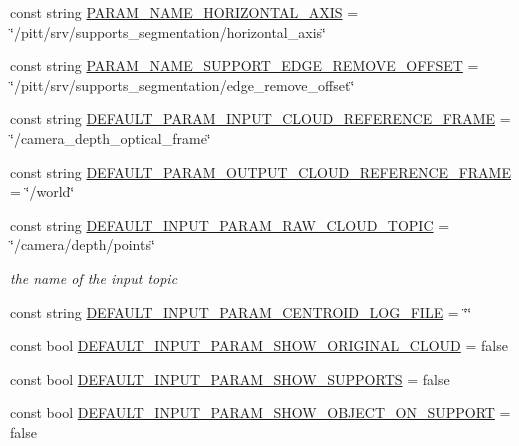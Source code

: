 \begin{DoxyCompactItemize}
\item 
const string \hyperlink{namespacesrvm_a2957bf6ee16944664364c470f1beb958}{P\-A\-R\-A\-M\-\_\-\-N\-A\-M\-E\-\_\-\-H\-O\-R\-I\-Z\-O\-N\-T\-A\-L\-\_\-\-A\-X\-I\-S} = \char`\"{}/pitt/srv/supports\-\_\-segmentation/horizontal\-\_\-axis\char`\"{}
\item 
const string \hyperlink{namespacesrvm_a07211b3f36f93931af6e67097b75f145}{P\-A\-R\-A\-M\-\_\-\-N\-A\-M\-E\-\_\-\-S\-U\-P\-P\-O\-R\-T\-\_\-\-E\-D\-G\-E\-\_\-\-R\-E\-M\-O\-V\-E\-\_\-\-O\-F\-F\-S\-E\-T} = \char`\"{}/pitt/srv/supports\-\_\-segmentation/edge\-\_\-remove\-\_\-offset\char`\"{}
\item 
const string \hyperlink{namespacesrvm_a2c4c31d893bfef55ede38ab56f4e7658}{D\-E\-F\-A\-U\-L\-T\-\_\-\-P\-A\-R\-A\-M\-\_\-\-I\-N\-P\-U\-T\-\_\-\-C\-L\-O\-U\-D\-\_\-\-R\-E\-F\-E\-R\-E\-N\-C\-E\-\_\-\-F\-R\-A\-M\-E} = \char`\"{}/camera\-\_\-depth\-\_\-optical\-\_\-frame\char`\"{}
\item 
const string \hyperlink{namespacesrvm_a228565e6d2ec6f457f78c4412d6c7daa}{D\-E\-F\-A\-U\-L\-T\-\_\-\-P\-A\-R\-A\-M\-\_\-\-O\-U\-T\-P\-U\-T\-\_\-\-C\-L\-O\-U\-D\-\_\-\-R\-E\-F\-E\-R\-E\-N\-C\-E\-\_\-\-F\-R\-A\-M\-E} = \char`\"{}/world\char`\"{}
\item 
const string \hyperlink{namespacesrvm_afb9bab9dced618a8992cf505cf484b1c}{D\-E\-F\-A\-U\-L\-T\-\_\-\-I\-N\-P\-U\-T\-\_\-\-P\-A\-R\-A\-M\-\_\-\-R\-A\-W\-\_\-\-C\-L\-O\-U\-D\-\_\-\-T\-O\-P\-I\-C} = \char`\"{}/camera/depth/points\char`\"{}
\begin{DoxyCompactList}\small\item\em the name of the input topic \end{DoxyCompactList}\item 
const string \hyperlink{namespacesrvm_a92921b8b79655fa69a697a54dca42056}{D\-E\-F\-A\-U\-L\-T\-\_\-\-I\-N\-P\-U\-T\-\_\-\-P\-A\-R\-A\-M\-\_\-\-C\-E\-N\-T\-R\-O\-I\-D\-\_\-\-L\-O\-G\-\_\-\-F\-I\-L\-E} = \char`\"{}\char`\"{}
\item 
const bool \hyperlink{namespacesrvm_ac54afc31491c977345ef1a1fbb563be3}{D\-E\-F\-A\-U\-L\-T\-\_\-\-I\-N\-P\-U\-T\-\_\-\-P\-A\-R\-A\-M\-\_\-\-S\-H\-O\-W\-\_\-\-O\-R\-I\-G\-I\-N\-A\-L\-\_\-\-C\-L\-O\-U\-D} = false
\item 
const bool \hyperlink{namespacesrvm_a9880144ef0df953c3b583e4f20dbff76}{D\-E\-F\-A\-U\-L\-T\-\_\-\-I\-N\-P\-U\-T\-\_\-\-P\-A\-R\-A\-M\-\_\-\-S\-H\-O\-W\-\_\-\-S\-U\-P\-P\-O\-R\-T\-S} = false
\item 
const bool \hyperlink{namespacesrvm_a8e6760e3e9557fc2fb87cbb6fcd8b3e6}{D\-E\-F\-A\-U\-L\-T\-\_\-\-I\-N\-P\-U\-T\-\_\-\-P\-A\-R\-A\-M\-\_\-\-S\-H\-O\-W\-\_\-\-O\-B\-J\-E\-C\-T\-\_\-\-O\-N\-\_\-\-S\-U\-P\-P\-O\-R\-T} = false

\end{DoxyCompactItemize}
